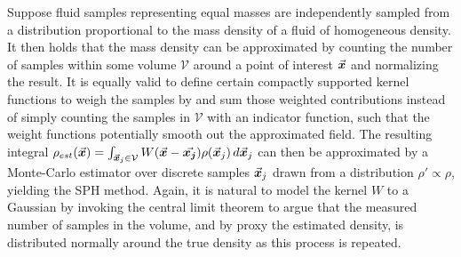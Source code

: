 Suppose fluid samples representing equal masses are independently sampled from a distribution proportional to the mass density of a fluid of homogeneous density. It then holds that the mass density can be approximated by counting the number of samples within some volume $\mathcal{V}$ around a point of interest $\vec{\bm{x}}$ and normalizing the result\autocite{smoothed-density-parzen-62}. It is equally valid to define certain compactly supported kernel functions to weigh the samples by and sum those weighted contributions instead of simply counting the samples in $\mathcal{V}$ with an indicator function, such that the weight functions potentially smooth out the approximated field\autocite*{smoothed-density-parzen-62}. The resulting integral\autocite*{sph-monaghan-gingold-77} $\rho_{est}(\vec{\bm{x}}) = \int_{\vec{\bm{x}}_j\in\mathcal{V}} W(\vec{\bm{x}}-\vec{\bm{x_j}})\rho(\vec{\bm{x}}_j)\,d\vec{\bm{x}}_j$ can then be approximated by a Monte-Carlo estimator over discrete samples $\vec{\bm{x}}_j$ drawn from a distribution $\rho' \propto \rho$, yielding the SPH method\autocite*{sph-monaghan-gingold-77}. Again, it is natural to model the kernel $W$ to a Gaussian by invoking the central limit theorem to argue that the measured number of samples in the volume, and by proxy the estimated density, is distributed normally around the true density as this process is repeated.

\horizontalspacer

